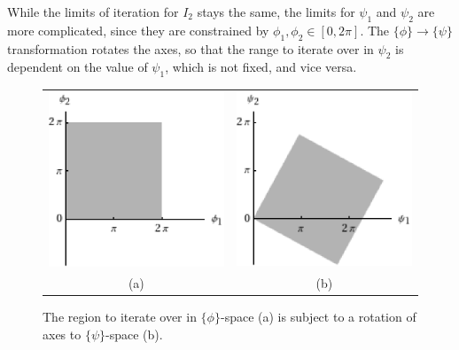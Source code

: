 While the limits of iteration for $I_2$ stays the same, the limits for $\psi_1$ and $\psi_2$ are more complicated, since they are constrained by $\phi_1,\phi_2 \in [0,2\pi]$.  The $\lbrace\phi\rbrace \rightarrow \lbrace\psi\rbrace$ transformation rotates the axes, so that the range to iterate over in $\psi_2$ is dependent on the value of $\psi_1$, which is not fixed, and vice versa.  
\begin{figure}[htp]
	\centering
	\begin{tabular}{c c}
	\includegraphics[scale=0.6]{phiblock.eps} & \includegraphics[scale=0.6]{psiblock.eps} \\
	(a) & (b)
	\end{tabular}
	\caption{The region to iterate over in $\lbrace\phi\rbrace$-space (a) is subject to a rotation of axes to $\lbrace\psi\rbrace$-space (b).}
	\label{fig:phipsi}
\end{figure}

